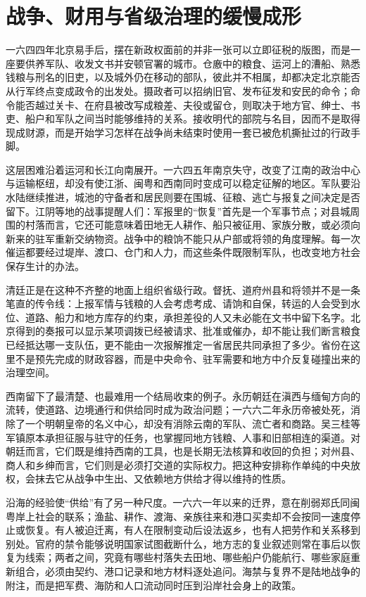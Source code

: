 \section{战争、财用与省级治理的缓慢成形}

一六四四年北京易手后，摆在新政权面前的并非一张可以立即征税的版图，而是一座要供养军队、收发文书并安顿官署的城市。仓廒中的粮食、运河上的漕船、熟悉钱粮与刑名的旧吏，以及城外仍在移动的部队，彼此并不相属，却都决定北京能否从行军终点变成政令的出发处。摄政者可以招纳旧官、发布征发和安民的命令；命令能否越过关卡、在府县被改写成粮差、夫役或留仓，则取决于地方官、绅士、书吏、船户和军队之间当时能够维持的关系。接收明代的部院与名目，因而不是取得现成财源，而是开始学习怎样在战争尚未结束时使用一套已被危机撕扯过的行政手脚。

这层困难沿着运河和长江向南展开。一六四五年南京失守，改变了江南的政治中心与运输枢纽，却没有使江浙、闽粤和西南同时变成可以稳定征解的地区。军队要沿水陆继续推进，城池的守备者和居民则要在围城、征粮、逃亡与报复之间决定是否留下。江阴等地的战事提醒人们：军报里的“恢复”首先是一个军事节点；对县城周围的村落而言，它还可能意味着田地无人耕作、船只被征用、家族分散，或必须向新来的驻军重新交纳物资。战争中的粮饷不能只从户部或将领的角度理解。每一次催运都要经过堤岸、渡口、仓门和人力，而这些条件既限制军队，也改变地方社会保存生计的办法。

清廷正是在这种不齐整的地面上组织省级行政。督抚、道府州县和将领并不是一条笔直的传令线：上报军情与钱粮的人会考虑考成、请饷和自保，转运的人会受到水位、道路、船力和地方库存的约束，承担差役的人又未必能在文书中留下名字。北京得到的奏报可以显示某项调拨已经被请求、批准或催办，却不能让我们断言粮食已经抵达哪一支队伍，更不能由一次报解推定一省居民共同承担了多少。省份在这里不是预先完成的财政容器，而是中央命令、驻军需要和地方中介反复碰撞出来的治理空间。

西南留下了最清楚、也最难用一个结局收束的例子。永历朝廷在滇西与缅甸方向的流转，使道路、边境通行和供给同时成为政治问题；一六六二年永历帝被处死，消除了一个明朝皇帝的名义中心，却没有消除云南的军队、流亡者和商路。吴三桂等军镇原本承担征服与驻守的任务，也掌握同地方钱粮、人事和旧部相连的渠道。对朝廷而言，它们既是维持西南的工具，也是长期无法核算和收回的负担；对州县、商人和乡绅而言，它们则是必须打交道的实际权力。把这种安排称作单纯的中央放权，会抹去它从战争中生出、又依赖地方供给才得以维持的性质。

沿海的经验使“供给”有了另一种尺度。一六六一年以来的迁界，意在削弱郑氏同闽粤岸上社会的联系；渔盐、耕作、渡海、亲族往来和港口买卖却不会按同一速度停止或恢复。有人被迫迁离，有人在限制变动后设法返乡，也有人把劳作和关系移到别处。官府的禁令能够说明国家试图截断什么，地方志的复业叙述则常在事后以恢复为线索；两者之间，究竟有哪些村落失去田地、哪些船户仍能航行、哪些家庭重新组合，必须由契约、港口记录和地方材料逐处追问。海禁与复界不是陆地战争的附注，而是把军费、海防和人口流动同时压到沿岸社会身上的政策。

